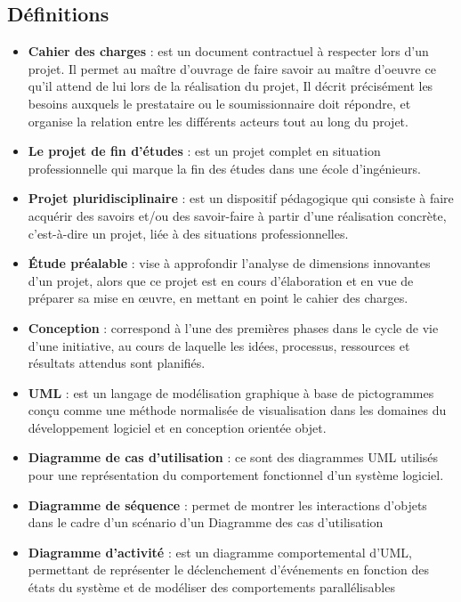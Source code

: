 \documentclass[11pt,fleqn]{book} %
\begin{document}
\subsection{Définitions}
\begin{itemize}
    \item \textbf{Cahier des charges} : est un document contractuel à respecter lors d'un projet. Il permet au maître d'ouvrage de faire savoir au maître d'oeuvre ce qu'il attend de lui lors de la réalisation du projet, Il décrit précisément les besoins auxquels le prestataire ou le soumissionnaire doit répondre, et organise la relation entre les différents acteurs tout au long du projet.
    \item \textbf{Le projet de fin d'études} : est un projet complet en situation professionnelle qui marque la fin des études dans une école d'ingénieurs. 
    \item \textbf{Projet pluridisciplinaire} : est un dispositif pédagogique qui consiste à faire acquérir des savoirs et/ou des savoir-faire à partir d'une réalisation concrète, c'est-à-dire un projet, liée à des situations professionnelles.
    \item  \textbf{Étude préalable} : vise à approfondir l'analyse de dimensions innovantes d'un projet, alors que ce projet est en cours d'élaboration et en vue de préparer sa mise en œuvre, en mettant en point le cahier des charges.
    \item  \textbf{Conception} : correspond à l'une des premières phases dans le cycle de vie d'une initiative, au cours de laquelle les idées, processus, ressources et résultats attendus sont planifiés.
    \item \textbf{UML} : est un langage de modélisation graphique à base de pictogrammes conçu comme une méthode normalisée de visualisation dans les domaines du développement logiciel et en conception orientée objet. 
    \item \textbf{Diagramme de cas d’utilisation} : ce sont des diagrammes UML utilisés pour une représentation du comportement fonctionnel d'un système logiciel.
    \item \textbf{Diagramme de séquence} : permet de montrer les interactions d'objets dans le cadre d'un scénario d'un Diagramme des cas d'utilisation
    \item \textbf{Diagramme d'activité} : est un diagramme comportemental d'UML, permettant de représenter le déclenchement d'événements en fonction des états du système et de modéliser des comportements parallélisables
\end{itemize}
\end{document}
